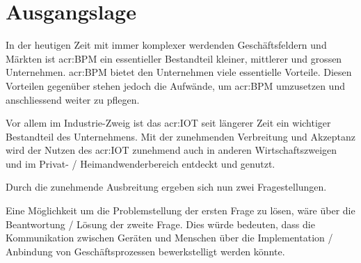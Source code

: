 
\chapter{Ausgangslage}

In der heutigen Zeit mit immer komplexer werdenden Geschäftsfeldern und Märkten ist \gls{acr:BPM} ein essentieller Bestandteil kleiner, mittlerer und grossen Unternehmen. \gls{acr:BPM} bietet den Unternehmen viele essentielle Vorteile. Diesen Vorteilen gegenüber stehen jedoch die Aufwände, um \gls{acr:BPM} umzusetzen und anschliessend weiter zu pflegen. 

Vor allem im Industrie-Zweig ist das \gls{acr:IOT} seit längerer Zeit ein wichtiger Bestandteil des Unternehmens. Mit der zunehmenden Verbreitung und Akzeptanz wird der Nutzen des \gls{acr:IOT} zunehmend auch in anderen Wirtschaftszweigen und im Privat- / Heimandwenderbereich entdeckt und genutzt.

Durch die zunehmende Ausbreitung ergeben sich nun zwei Fragestellungen.

\begin{itemize}
\end{itemize}

Eine Möglichkeit um die Problemstellung der ersten Frage zu lösen, wäre über die Beantwortung / Lösung der zweite Frage. Dies würde bedeuten, dass die Kommunikation zwischen Geräten und Menschen über die Implementation / Anbindung von Geschäftsprozessen bewerkstelligt werden könnte.

